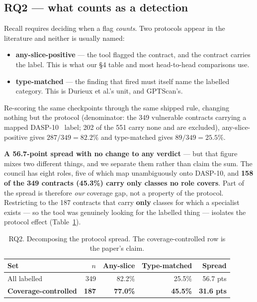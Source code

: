 \documentclass[sigconf,nonacm]{acmart}
\begin{document}
\subsection{RQ2 --- what counts as a detection}
\label{sec:rq2}

Recall requires deciding when a flag \emph{counts}. Two protocols appear in the
literature and neither is usually named:

\begin{itemize}
\item \textbf{any-slice-positive} --- the tool flagged the contract, and the
  contract carries the label. This is what our \S4 table and most head-to-head
  comparisons use.
\item \textbf{type-matched} --- the finding that fired must itself name the
  labelled category. This is Durieux et al.'s unit, and GPTScan's.
\end{itemize}

Re-scoring the same checkpoints through the same shipped rule, changing nothing
but the protocol (denominator: the 349 vulnerable contracts carrying a mapped
DASP-10~\cite{dasp} label; 202 of the 551 carry none and are excluded),
any-slice-positive gives $287/349 = \mathbf{82.2\%}$ and type-matched gives
$89/349 = \mathbf{25.5\%}$.

\textbf{A 56.7-point spread with no change to any verdict} --- but that figure
mixes two different things, and we separate them rather than claim the sum. The
council has eight roles, five of which map unambiguously onto DASP-10, and
\textbf{158 of the 349 contracts (45.3\%) carry only classes no role covers}.
Part of the spread is therefore \emph{our} coverage gap, not a property of the
protocol. Restricting to the 187 contracts that carry \textbf{only} classes for
which a specialist exists --- so the tool was genuinely looking for the labelled
thing --- isolates the protocol effect (Table~\ref{tab:rq2}).

\begin{table}[t]
\centering
\caption{RQ2. Decomposing the protocol spread. The coverage-controlled row is the
paper's claim.}
\label{tab:rq2}
\small
\begin{tabular}{@{}lrrrr@{}}
\toprule
\textbf{Set} & \textbf{$n$} & \textbf{Any-slice} & \textbf{Type-matched} &
\textbf{Spread} \\
\midrule
All labelled & 349 & 82.2\% & 25.5\% & 56.7 pts \\
\textbf{Coverage-controlled} & \textbf{187} & \textbf{77.0\%} &
\textbf{45.5\%} & \textbf{31.6 pts} \\
\bottomrule
\end{tabular}
\end{table}
\end{document}
